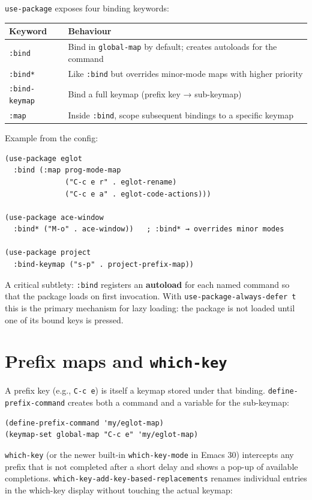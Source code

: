 \texttt{use-package} exposes four binding keywords:

\begin{longtable}[]{@{}ll@{}}
\toprule
Keyword & Behaviour \\
\midrule
\texttt{:bind} & Bind in \texttt{global-map} by default; creates autoloads for the command \\
\texttt{:bind*} & Like \texttt{:bind} but overrides minor-mode maps with higher priority \\
\texttt{:bind-keymap} & Bind a full keymap (prefix key → sub-keymap) \\
\texttt{:map} & Inside \texttt{:bind}, scope subsequent bindings to a specific keymap \\
\bottomrule
\end{longtable}

Example from the config:

\begin{verbatim}
(use-package eglot
  :bind (:map prog-mode-map
              ("C-c e r" . eglot-rename)
              ("C-c e a" . eglot-code-actions)))

(use-package ace-window
  :bind* ("M-o" . ace-window))   ; :bind* → overrides minor modes

(use-package project
  :bind-keymap ("s-p" . project-prefix-map))
\end{verbatim}

A critical subtlety: \texttt{:bind} registers an \textbf{autoload} for each named command so that the package loads on first invocation. With \texttt{use-package-always-defer t} this is the primary mechanism for lazy loading: the package is not loaded until one of its bound keys is pressed.

\section{Prefix maps and \texttt{which-key}}\label{prefix-maps-and-which-key}

A prefix key (e.g., \texttt{C-c e}) is itself a keymap stored under that binding. \texttt{define-prefix-command} creates both a command and a variable for the sub-keymap:

\begin{verbatim}
(define-prefix-command 'my/eglot-map)
(keymap-set global-map "C-c e" 'my/eglot-map)
\end{verbatim}

\texttt{which-key} (or the newer built-in \texttt{which-key-mode} in Emacs 30) intercepts any prefix that is not completed after a short delay and shows a pop-up of available completions. \texttt{which-key-add-key-based-replacements} renames individual entries in the which-key display without touching the actual keymap:

